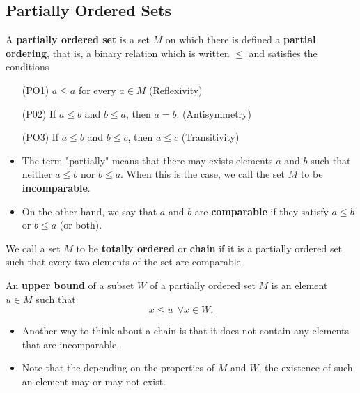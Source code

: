 \subsection{Partially Ordered Sets}


\begin{definition}
   A \textbf{partially ordered set} is a set \( M  \) on which there is defined a \textbf{partial ordering}, that is, a binary relation which is written \( \leq  \) and satisfies the conditions
    \begin{enumerate}
        \item[(PO1)] \( a \leq a  \) for every \( a \in M  \) (Reflexivity)
        \item[(P02)] If \( a \leq b  \) and \( b \leq a  \), then \( a = b  \). (Antisymmetry)
        \item[(PO3)] If \( a \leq b  \) and \( b \leq c  \), then \( a \leq c  \) (Transitivity)
    \end{enumerate}
\end{definition}

\begin{itemize}
    \item The term "partially" means that there may exists elements \( a  \) and \( b  \) such that neither \( a \leq b  \) nor \( b \leq a  \). When this is the case, we call the set \( M  \) to be \textbf{incomparable}.
    \item On the other hand, we say that \( a  \) and \( b  \) are \textbf{comparable} if they satisfy \( a \leq b  \) or \( b \leq a  \) (or both).
\end{itemize}

\begin{definition}
   We call a set \( M  \) to be \textbf{totally ordered} or \textbf{chain} if it is a partially ordered set such that every two elements of the set are comparable.
\end{definition}

\begin{definition}
    An \textbf{upper bound} of a subset \( W  \) of a partially ordered set \( M  \) is an element \( u \in M  \) such that 
    \[  x \leq u \ \ \forall x \in W.  \]
\end{definition}

\begin{itemize}
    \item Another way to think about a chain is that it does not contain any elements that are incomparable. 
    \item Note that the depending on the properties of \( M  \) and \( W  \), the existence of such an element may or may not exist.
\end{itemize}

